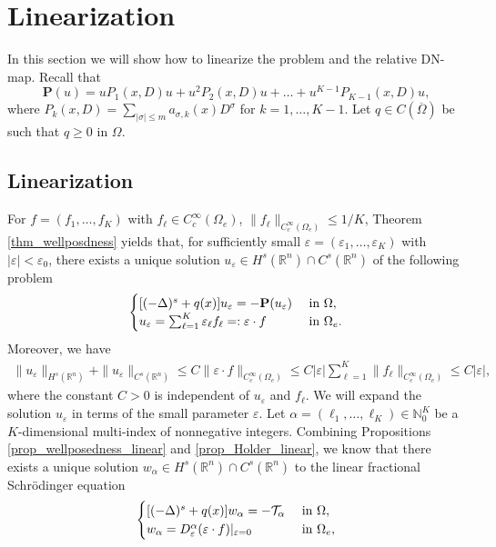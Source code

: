 \documentclass [oneside,11pt] {amsart}
\numberwithin{equation}{section}
\newcommand{\R}{\mathbb{R}}
\begin{document}
\section{Linearization}
In this section we will show how to linearize the problem and the relative DN-map. Recall that 
\[
\mathbf{P}(u) =uP_1(x,D)u + u^2 P_2(x,D)u+\ldots+u^{K-1}P_{K-1}(x,D)u, 
\]
where $P_k(x,D) = \sum_{|\sigma|\leq m}a_{\sigma,k }  (x)D^\sigma$ for $k = 1,\ldots,K-1.$
Let $q\in C(\overline\Omega)$ be such that $q\ge 0$ in $\Omega$. 

\subsection{Linearization}\label{sec_linearization}
For $f=(f_1,\ldots,f_K)$ with $f_\ell\in C^\infty_c(\Omega_e)$, $\|f_\ell\|_{C_c^\infty(\Omega_e)}\le 1/K$, Theorem \ref{thm_wellposdness} yields that, for sufficiently small $\varepsilon = (\varepsilon_1,\ldots,\varepsilon_K)$  with $|\varepsilon|<\varepsilon_0$, there exists a unique solution $u_\varepsilon \in H^s(\R^n)\cap C^s(\R^n)$ of the following problem 
\begin{equation}\label{eq_3_linearization}
\begin{cases}
[(-\Delta)^s + q(x)]u_\varepsilon =- \mathbf{P}(u_\varepsilon) &\hbox{ in } \Omega,\\
u_\varepsilon = \sum_{\ell=1}^K \varepsilon_\ell f_\ell=:\varepsilon\cdot f &\hbox{ in } \Omega_e.
\end{cases}
\end{equation}
Moreover, we have 
\begin{align}\label{eq_3_linear_u_est}
\|u_\varepsilon\|_{H^{s}(\R^n)}+
\|u_\varepsilon\|_{C^{s}(\R^n)}\le C\|\varepsilon\cdot f\|_{C_c^\infty(\Omega_e)}\le C|\varepsilon|\sum_{\ell=1}^K\|f_\ell\|_{C_c^\infty(\Omega_e)}\le C|\varepsilon|,
\end{align}
where the constant $C > 0$ is independent of $u_\varepsilon$ and $f_\ell$. We will expand the solution $u_\varepsilon$ in terms of the small parameter $\varepsilon$. Let $\alpha=(\ell_1,\ldots,\ell_K)\in \mathbb{N}^K_0 $ be a $K$-dimensional multi-index of nonnegative integers. Combining Propositions \ref{prop_wellposedness_linear} and \ref{prop_Holder_linear}, we know that there exists a unique solution $w_{\alpha}\in H^s(\R^n)\cap C^{s}(\R^n)$ to the linear fractional Schr\"odinger equation 
\begin{equation}
\label{eq_3_linear_w_3}
\begin{cases}
[(-\Delta)^s   + q(x)]w_{\alpha} =- \mathcal{T}_{\alpha} &\hbox{ in } \Omega,\\
w_{\alpha} =  D^\alpha_\varepsilon (\varepsilon\cdot f)|_{\varepsilon=0} &\hbox{ in } \Omega_e,
\end{cases}
\end{equation}
\end{document}
